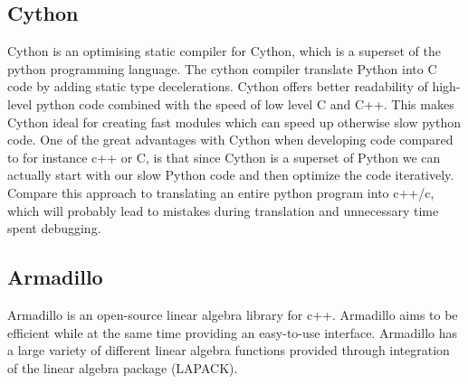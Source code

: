  \subsection*{Cython}	
Cython is an optimising static compiler for Cython, which is a superset of the	
python programming language. The cython compiler translate Python into C code by	
adding static type decelerations. Cython offers better readability of high-level	
python code combined with the speed of low level C and C++. This makes Cython ideal for	
creating fast modules which can speed up otherwise slow python code. One of the	
great advantages with Cython when developing code compared to for instance c++	
or C, is that since Cython is a superset of Python we can actually start with	
our slow Python code and then optimize the code iteratively. Compare this	
approach to translating an entire python program into c++/c, which will probably	
lead to mistakes during translation and unnecessary time spent debugging.	

 \subsection*{Armadillo}	
Armadillo is an open-source linear algebra library for c++. Armadillo aims to	
be efficient while at the same time providing an easy-to-use interface. Armadillo	
has a large variety of different linear algebra functions provided through	
integration of the linear algebra package (LAPACK).	
